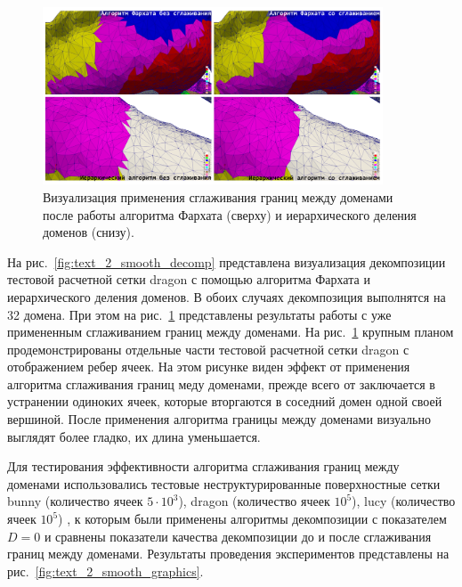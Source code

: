 \begin{figure}[!ht]
\centering
\includegraphics[width=0.9\textwidth]{fig/par_dragon_decomp2.pdf}
\singlespacing
{}\caption{Визуализация применения сглаживания границ между доменами после работы алгоритма Фархата (сверху) и иерархического деления доменов (снизу).}
\label{fig:text_2_smooth_decomp2}
\end{figure}

На рис.~\ref{fig:text_2_smooth_decomp} представлена визуализация декомпозиции тестовой расчетной сетки dragon \cite{StanfordModels} с помощью алгоритма Фархата и иерархического деления доменов.
В обоих случаях декомпозиция выполнятся на 32 домена.
При этом на рис.~\ref{fig:text_2_smooth_decomp2} представлены результаты работы с уже примененным сглаживанием границ между доменами.
На рис.~\ref{fig:text_2_smooth_decomp2} крупным планом продемонстрированы отдельные части тестовой расчетной сетки dragon с отображением ребер ячеек.
На этом рисунке виден эффект от применения алгоритма сглаживания границ меду доменами, прежде всего от заключается в устранении одиноких ячеек, которые вторгаются в соседний домен одной своей вершиной.
После применения алгоритма границы между доменами визуально выглядят более гладко, их длина уменьшается.

Для тестирования эффективности алгоритма сглаживания границ между доменами использовались тестовые неструктурированные поверхностные сетки bunny (количество ячеек $5 \cdot 10^3$), dragon (количество ячеек $10^5$), lucy (количество ячеек $10^5$) \cite{StanfordModels}, к которым были применены алгоритмы декомпозиции с показателем $D = 0$ и сравнены показатели качества декомпозиции до и после сглаживания границ между доменами.
Результаты проведения экспериментов представлены на рис.~\ref{fig:text_2_smooth_graphics}.

